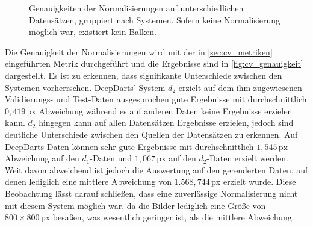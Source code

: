 \begin{figure}
    \centering
    \caption{Genauigkeiten der Normalisierungen auf unterschiedlichen Datensätzen, gruppiert nach Systemen. Sofern keine Normalisierung möglich war, existiert kein Balken.}
    \label{fig:cv_genauigkeit}
\end{figure}

Die Genauigkeit der Normalisierungen wird mit der in \autoref{sec:cv_metriken} eingeführten Metrik durchgeführt und die Ergebnisse sind in \autoref{fig:cv_genauigkeit} dargestellt. Es ist zu erkennen, dass signifikante Unterschiede zwischen den Systemen vorherrschen. DeepDarts' System $d_2$ erzielt auf dem ihm zugewiesenen Validierungs- und Test-Daten ausgesprochen gute Ergebnisse mit durchschnittlich $0,419\,\text{px}$ Abweichung während es auf anderen Daten keine Ergebnisse erzielen kann. $d_2$ hingegen kann auf allen Datensätzen Ergebnisse erzielen, jedoch sind deutliche Unterschiede zwischen den Quellen der Datensätzen zu erkennen. Auf DeepDarts-Daten können sehr gute Ergebnisse mit durchschnittlich $1,545\,\text{px}$ Abweichung auf den $d_1$-Daten und $1,067\,\text{px}$ auf den $d_2$-Daten erzielt werden. Weit davon abweichend ist jedoch die Auswertung auf den gerenderten Daten, auf denen lediglich eine mittlere Abweichung von $1.568,744\,\text{px}$ erzielt wurde.
Diese Beobachtung lässt darauf schließen, dass eine zuverlässige Normalisierung nicht mit diesem System möglich war, da die Bilder lediglich eine Größe von $800 \times 800\,\text{px}$ besaßen, was wesentlich geringer ist, als die mittlere Abweichung.

